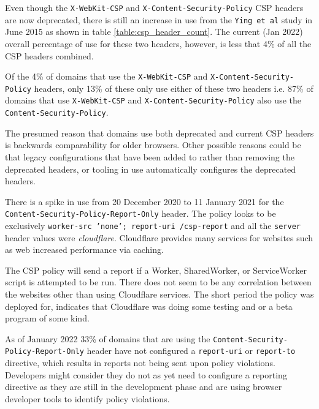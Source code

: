 \documentclass{mscreport}
\begin{document}
\vspace{0.3cm} \noindent
Even though the \texttt{X-WebKit-CSP} and \texttt{X-Content-Security-Policy} CSP headers are now deprecated, there is still an increase in use from the \texttt{Ying et al} study \cite{Ying2016-ag} in June 2015 as shown in table \ref{table:csp_header_count}. The current (Jan 2022) overall percentage of use for these two headers, however, is less that 4\% of all the CSP headers combined.

\vspace{0.3cm} \noindent
Of the 4\% of domains that use the \texttt{X-WebKit-CSP} and \texttt{X-Content-Security-Policy} headers, only 13\% of these only use either of these two headers i.e. 87\% of domains that use \texttt{X-WebKit-CSP} and \texttt{X-Content-Security-Policy} also use the \texttt{Content-Security-Policy}.

\vspace{0.3cm} \noindent
The presumed reason that domains use both deprecated and current CSP headers is backwards comparability for older browsers. Other possible reasons could be that legacy configurations that have been added to rather than removing the deprecated headers, or tooling in use automatically configures the deprecated headers.

\vspace{0.3cm} \noindent
There is a spike in use from 20 December 2020 to 11 January 2021 for the \newline \texttt{Content-Security-Policy-Report-Only} header. The policy looks to be exclusively \newline \texttt{worker-src 'none'; report-uri /csp-report} and all the \texttt{server} header values were \textit{cloudflare}. Cloudflare provides many services for websites such as web increased performance via caching.

\vspace{0.3cm} \noindent
The CSP policy will send a report if a Worker, SharedWorker, or ServiceWorker script is attempted to be run. There does not seem to be any correlation between the websites other than using Cloudflare services. The short period the policy was deployed for, indicates that Cloudflare was doing some testing and or a beta program of some kind.

\vspace{0.3cm} \noindent
As of January 2022 33\% of domains that are using the \newline \texttt{Content-Security-Policy-Report-Only} header have not configured a \texttt{report-uri} or \texttt{report-to} directive, which results in reports not being sent upon policy violations. Developers might consider they do not as yet need to configure a reporting directive as they are still in the development phase and are using browser developer tools to identify policy violations.
\end{document}

